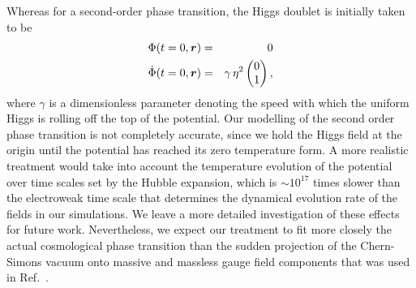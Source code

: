 \documentclass[prd,twocolumn,nofootinbib]{revtex4-1}
\begin{document}
Whereas for a second-order phase transition, the Higgs doublet is 
initially taken to be
\begin{eqnarray}
\Phi(t=0,{\bm r}) &=& 0 \notag \\
\dot\Phi(t=0,{\bm r}) &=& \gamma \, \eta^2
\begin{pmatrix} 0 \\ 1 \end{pmatrix}, 
\label{2nd-order-pt}
\end{eqnarray}
where $\gamma$ is a dimensionless parameter denoting the speed with which
the uniform Higgs is rolling off the top of the potential.
Our modelling of the second order phase transition is not completely
accurate, since we hold the Higgs field at the origin until the potential has
reached its zero temperature form. A more realistic treatment would take 
into account the temperature evolution of the potential over time scales
set by the Hubble expansion, which is $\sim 10^{17}$ times slower than the 
electroweak time scale that determines the dynamical evolution rate of the 
fields in our simulations. We leave a more detailed investigation of these
effects for future work. Nevertheless, we expect our treatment to fit 
more closely the actual cosmological phase transition than the sudden 
projection of the Chern-Simons vacuum
onto massive and massless gauge field components that was used in
Ref.~\cite{jackiw2000creation}.
\end{document}
